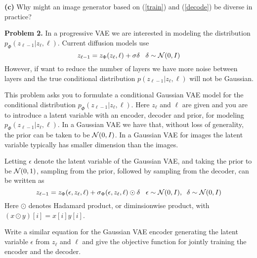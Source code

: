 \documentclass{article}
\newcommand{\solution}[1]{}
\begin{document}
\medskip
{\bf (c)} Why might an image generator based on (\ref{train}) and (\ref{decode}) be diverse in practice?

\solution{
  The universality assumption does not hold in practice and hence we should not expect $z_{\ell-1}(z_L,L)$ to be truly constant independent of $z_L$.  This variation
  can be amplified through the decoding process.}

\bigskip

{\bf Problem 2.} In a progressive VAE we are interested in modeling the distribution $p_\Phi(z_{\ell-1}|z_\ell,\ell)$.  Current
diffusion models use
$$z_{\ell-1} = z_\Phi(z_\ell,\ell) + \sigma\delta\;\;\;\delta \sim {\cal N}(0,I)$$
However, if want to reduce the number of layers we have more noise between layers and the true conditional distribution $p(z_{\ell-1}|z_\ell,\ell)$ will not be Gaussian.

\medskip
This problem asks you to formulate a conditional Gaussian VAE model for the conditional distribution $p_\Phi(z_{\ell-1}|z_\ell,\ell)$.
Here $z_\ell$ and $\ell$ are given and you are to introduce a latent variable with an encoder, decoder and prior, for modeling
$p_\Phi(z_{\ell-1}|z_\ell,\ell)$.  In a Gaussian VAE we have that, without loss of generality, the prior can be taken to be ${\cal N}(0,I)$.
In a Gaussian VAE for images the latent variable typically has smaller dimension than the images.

\medskip
Letting $\epsilon$ denote the latent variable of the Gaussian VAE, and taking the prior to be ${\cal N}(0,1)$, sampling from the prior, followed by sampling from the decoder, can be written as
$$z_{\ell-1} = z_\Phi(\epsilon,z_\ell,\ell) + \sigma_\Phi(\epsilon,z_\ell,\ell)\odot\delta\;\;\;\epsilon \sim {\cal N}(0,I), \;\;\delta \sim {\cal N}(0,I)$$
Here $\odot$ denotes Hadamard product, or diminsionwise product, with $(x \odot y)[i] = x[i]y[i]$.

\medskip
Write a similar equation for the Gaussian VAE encoder generating the latent variable $\epsilon$ from $z_\ell$ and $\ell$ and give the objective function for jointly training the encoder and the decoder.

\solution{
For encoding the latent variable $\epsilon$ we introduce a model
$$\epsilon = \epsilon_\Psi(z_{\ell-1},z_\ell,\ell) + \sigma_\Psi(z_{\ell-1},z_\ell,\ell) \odot \gamma\;\;\;\gamma \sim {\cal N}(0,I)$$
The training objective is then
$$\Phi^*,\Psi^* = \argmin_{\Phi,\Psi} \;E_{y,\ell,z_{\ell-1},z_\ell,\epsilon}\;\;KL(p_\Psi(\epsilon|z_{\ell-1},z_\ell,\ell),{\cal N}(0,I)) - \ln p_\Phi(z_{\ell-1}|\epsilon,z_\ell,\ell)$$

\medskip
There are various equivalent ways of writing this which also get full credit.
}
    
\end{document}
